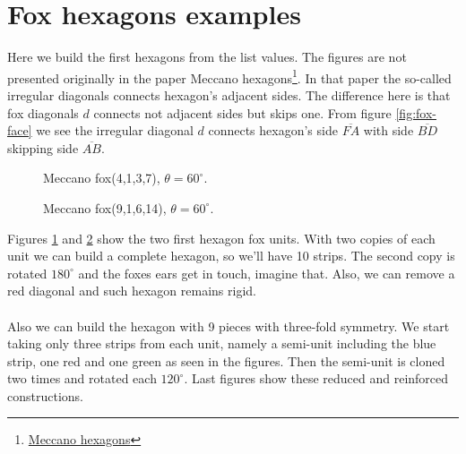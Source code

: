 \documentclass[11pt]{article}
\begin{document}
\section{Fox hexagons examples}

Here we build the first hexagons from the list values. The figures are not presented originally in the paper
Meccano hexagons\footnote{
\href{https://github.com/heptagons/meccano/tree/main/hexa/hexagons.pdf}{Meccano hexagons}	
}. In that paper the so-called irregular diagonals connects hexagon's adjacent sides. 
The difference here is that fox diagonals $d$ connects not adjacent sides but skips one. 
From figure \ref{fig:fox-face} we see the irregular diagonal $d$ connects hexagon's side $\overline{FA}$
with side $\overline{BD}$ skipping side $\overline{AB}$.

\setlength{\columnsep}{10pt}
\begin{multicols}{1}
\begin{figure}[H]
\centering
{}
\caption{Meccano fox(4,1,3,7), $\theta=60^\circ$.}
\label{fig:4-1-3-7}
\end{figure}

\begin{figure}[H]
\centering
{}
\caption{Meccano fox(9,1,6,14), $\theta=60^\circ$.}
\label{fig:9-1-6-14}
\end{figure}
\end{multicols}

Figures \ref{fig:4-1-3-7} and \ref{fig:9-1-6-14} show the two first hexagon fox units. With 
two copies of each unit we can build a complete hexagon, so we'll have 10 strips. The second copy
is rotated $180^\circ$ and the foxes ears get in touch, imagine that. Also, we can remove a
red diagonal and such hexagon remains rigid.
\\\\
Also we can build the hexagon with 9 pieces with three-fold symmetry.
We start taking only three strips from each unit,
namely a semi-unit including the blue strip, one red and one green as seen in the figures.
Then the semi-unit is cloned two times and rotated each $120^\circ$.
Last figures show these reduced and reinforced constructions.
\end{document}
